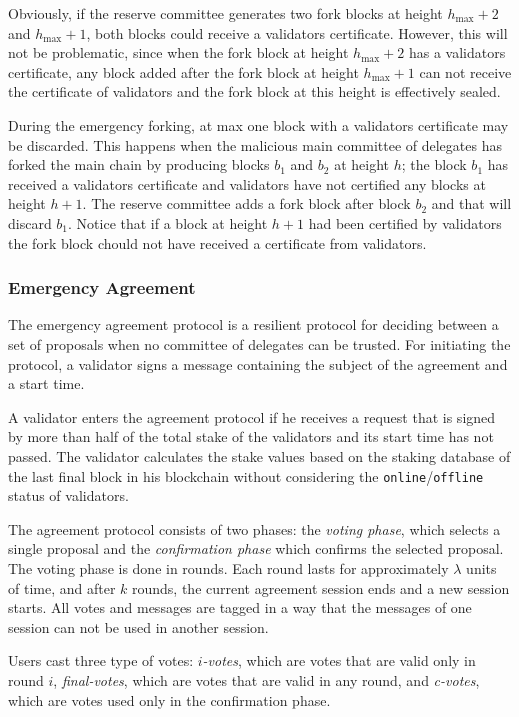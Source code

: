 Obviously, if the reserve committee generates two fork blocks at height $h_{\max} + 2$ and $h_{\max} + 1$, both blocks
could receive a validators certificate. However, this will not be problematic, since when the fork block at height
$h_{\max} + 2$ has a validators certificate, any block added after the fork block at height $h_{\max} + 1$ can not
receive the certificate of validators and the fork block at this height is effectively sealed.

During the emergency forking, at max one block with a validators certificate may be discarded. This happens when
the malicious main committee of delegates has forked the main chain by producing blocks $b_1$ and $b_2$ at height
$h$; the block $b_1$ has received a validators certificate and validators have not certified any blocks at height $h+1$.
The reserve committee adds a fork block after block $b_2$ and that will discard $b_1$. Notice that if a block at
height $h+1$ had been certified by validators the fork block chould not have received a certificate from validators.

\subsubsection{Emergency Agreement}

The emergency agreement protocol is a resilient protocol for deciding between a set of proposals when no committee of
delegates can be trusted. For initiating the protocol, a validator signs a message containing the subject
of the agreement and a start time.

A validator enters the agreement protocol if he
receives a request that is signed by more than half of the total stake
of the validators and its start time has not passed. The validator calculates
the stake values based on the staking database of the last final block in his blockchain without
considering the \texttt{online}/\texttt{offline} status of validators.

The agreement protocol consists of two phases: the \emph{voting phase}, which selects a single proposal
and the \emph{confirmation phase} which confirms the selected proposal. The voting phase is done in rounds.
Each round lasts for approximately $\lambda$ units of time, and after $k$ rounds, the current agreement session ends
and a
new session starts. All votes and messages are tagged in a way that the messages of one session can
not be used in another session.

Users cast three type of votes: \emph{$i$-votes}, which are votes that are valid only in
round $i$, \emph{final-votes}, which are votes that are valid in any round, and \emph{c-votes}, which are votes
used only in the confirmation phase.

